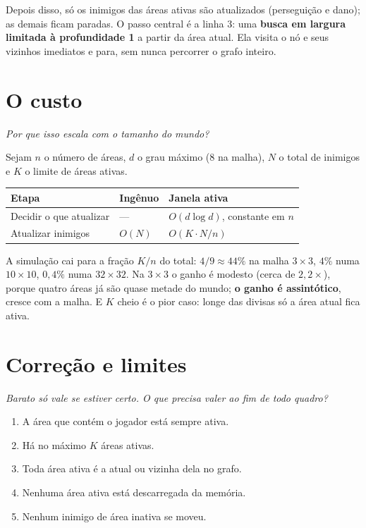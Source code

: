 \documentclass[11pt,a4paper]{article}
\newcommand{\gancho}[1]{\textcolor{destaque}{\textit{#1}}\par}
\begin{document}
Depois disso, só os inimigos das áreas ativas são atualizados (perseguição e
dano); as demais ficam paradas. O passo central é a linha 3: uma \textbf{busca
em largura limitada à profundidade 1} a partir da área atual. Ela visita o nó e
seus vizinhos imediatos e para, sem nunca percorrer o grafo inteiro.

\section{O custo}

\gancho{Por que isso escala com o tamanho do mundo?}

Sejam $n$ o número de áreas, $d$ o grau máximo (8 na malha), $N$ o total de
inimigos e $K$ o limite de áreas ativas.

\begin{center}
\begin{tabular}{@{}lll@{}}
\toprule
Etapa & Ingênuo & Janela ativa \\
\midrule
Decidir o que atualizar & --- & $O(d \log d)$, constante em $n$ \\
Atualizar inimigos & $O(N)$ & $O(K \cdot N/n)$ \\
\bottomrule
\end{tabular}
\end{center}

A simulação cai para a fração $K/n$ do total: $4/9 \approx 44\%$ na malha
$3\times3$, $4\%$ numa $10\times10$, $0{,}4\%$ numa $32\times32$. Na $3\times3$
o ganho é modesto (cerca de $2{,}2\times$), porque quatro áreas já são quase
metade do mundo; \textbf{o ganho é assintótico}, cresce com a malha. E $K$
cheio é o pior caso: longe das divisas só a área atual fica ativa.

\section{Correção e limites}

\gancho{Barato só vale se estiver certo. O que precisa valer ao fim de todo
quadro?}

\begin{enumerate}
  \item A área que contém o jogador está sempre ativa.
  \item Há no máximo $K$ áreas ativas.
  \item Toda área ativa é a atual ou vizinha dela no grafo.
  \item Nenhuma área ativa está descarregada da memória.
  \item Nenhum inimigo de área inativa se moveu.
\end{enumerate}
\end{document}
